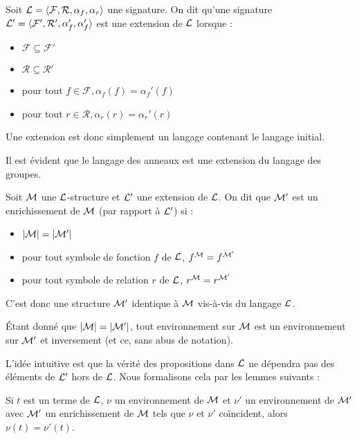 \begin{defi}
    Soit $\mathcal L = \langle \mathcal F,\mathcal R,\alpha_f,\alpha_r\rangle$ une signature. On dit qu'une signature $\mathcal L'=\langle \mathcal F',\mathcal R',\alpha_f',\alpha_f'\rangle$ est une extension de $\mathcal L$ lorsque :
    \begin{itemize}[label=$\bullet$]
        \item $\mathcal F \subseteq \mathcal F'$
        \item $\mathcal R \subseteq \mathcal R'$
        \item pour tout $f\in\mathcal F, \alpha_f(f)=\alpha_f'(f)$
        \item pour tout $r\in\mathcal R, \alpha_r(r)=\alpha_r'(r)$
    \end{itemize}
    Une extension est donc simplement un langage contenant le langage initial.
\end{defi}

\begin{expl}
    Il est évident que le langage des anneaux est une extension du langage des groupes.
\end{expl}

\begin{defi}
    Soit $\mathcal M$ une $\mathcal L$-structure et $\mathcal L'$ une extension de $\mathcal L$. On dit que $\mathcal M'$ est un enrichissement de $\mathcal M$ (par rapport à $\mathcal L'$) si :
    \begin{itemize}[label=$\bullet$]
        \item $|\mathcal M|=|\mathcal M'|$
        \item pour tout symbole de fonction $f$ de $\mathcal L$, $f^\mathcal M= f^{\mathcal M'}$
        \item pour tout symbole de relation $r$ de $\mathcal L$, $r^\mathcal M= r^{\mathcal M'}$
    \end{itemize}
    C'est donc une structure $\mathcal M'$ identique à $\mathcal M$ vis-à-vis du langage $\mathcal L$.
\end{defi}

\begin{rmk}
    \'Etant donné que $|\mathcal M|=|\mathcal M'|$, tout environnement sur $\mathcal M$ est un environnement sur $\mathcal M'$ et inversement (et ce, sans abus de notation).
\end{rmk}

L'idée intuitive est que la vérité des propositions dans $\mathcal L$ ne dépendra pas des éléments de $\mathcal L'$ hors de $\mathcal L$. Nous formalisons cela par les lemmes suivants :

\begin{lem}
    Si $t$ est un terme de $\mathcal L$, $\nu$ un environnement de $\mathcal M$ et $\nu'$ un environnement de $\mathcal M'$ avec $\mathcal M'$ un enrichissement de $\mathcal M$ tels que $\nu$ et $\nu'$ coïncident, alors $\nu(t)=\nu'(t)$.
\end{lem}

